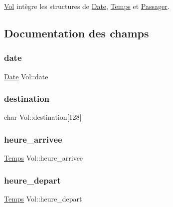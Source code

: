 \hyperlink{structVol}{Vol} intègre les structures de \hyperlink{structDate}{Date}, \hyperlink{structTemps}{Temps} et \hyperlink{structPassager}{Passager}. 

\subsection{Documentation des champs}
\mbox{\label{structVol_ae4f2e6f74614e8103f73fc16f3d345fb}} 
\subsubsection{\texorpdfstring{date}{date}}
{\footnotesize\ttfamily \hyperlink{structDate}{Date} Vol\+::date}

\mbox{\label{structVol_a1b7b37d7664fce7454e30b7ebbdb18a5}} 
\subsubsection{\texorpdfstring{destination}{destination}}
{\footnotesize\ttfamily char Vol\+::destination\mbox{[}128\mbox{]}}

\mbox{\label{structVol_ae591d22a45cc86b4b85a329fd2203030}} 
\subsubsection{\texorpdfstring{heure\+\_\+arrivee}{heure\_arrivee}}
{\footnotesize\ttfamily \hyperlink{structTemps}{Temps} Vol\+::heure\+\_\+arrivee}

\mbox{\label{structVol_a8f76dcdd0bc26f6f95a27df539dd76dc}} 
\subsubsection{\texorpdfstring{heure\+\_\+depart}{heure\_depart}}
{\footnotesize\ttfamily \hyperlink{structTemps}{Temps} Vol\+::heure\+\_\+depart}

\mbox{\label{structVol_a232eef7acb107fe79c1f91cd08fa4f03}} 
